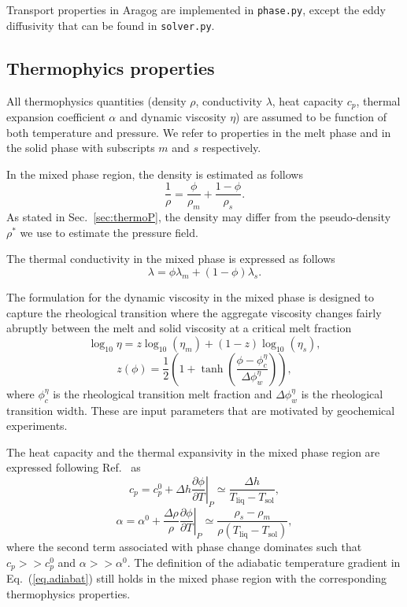 \documentclass{article}
\begin{document}
Transport properties in Aragog are implemented in \texttt{phase.py}, except the eddy diffusivity that can be found in \texttt{solver.py}.

\subsection{Thermophyics properties}

All thermophysics quantities (density $\rho$, conductivity $\lambda$, heat capacity $c_p$, thermal expansion coefficient $\alpha$ and dynamic viscosity $\eta$) are assumed to be function of both temperature and pressure. We refer to properties in the melt phase and in the solid phase with subscripts $m$ and $s$ respectively.

In the mixed phase region, the density is estimated as follows
\begin{equation}
    \frac{1}{\rho}=\frac{\phi}{\rho_m}+\frac{1-\phi}{\rho_s}.
\end{equation}
As stated in Sec.~\ref{sec:thermoP}, the density may differ from the pseudo-density $\rho^*$ we use to estimate the pressure field.

The thermal conductivity in the mixed phase is expressed as follows
\begin{equation}
    \lambda = \phi \lambda_m + (1-\phi)\lambda_s.
\end{equation}

The formulation for the dynamic viscosity in the mixed phase is designed to capture the rheological transition where the aggregate viscosity changes fairly abruptly between the melt and solid viscosity at a critical melt fraction~\cite{BSW18}
\begin{equation}
    \log_{10} \eta = z\log_{10}(\eta_m) + (1-z)\log_{10}(\eta_s),
\end{equation}
\begin{equation}
    z(\phi)=\frac{1}{2}\left(1+\tanh\left( \frac{\phi-\phi_c^\eta}{\Delta\phi_w^\eta}\right) \right),
\end{equation}
where $\phi_c^\eta$ is the rheological transition melt fraction and $\Delta \phi_w^\eta$ is the rheological transition width. These are input parameters that are motivated by geochemical experiments.

The heat capacity and the thermal expansivity in the mixed phase region are expressed following Ref.~\cite{SOLO07} as
\begin{equation}
    c_p = c_p^0 + \Delta h \left.\frac{\partial \phi}{\partial T}\right|_P \simeq \frac{\Delta h}{T_\mathrm{liq}- T_\mathrm{sol}},
\end{equation}
\begin{equation}
    \alpha = \alpha^0 + \frac{\Delta \rho }{\rho} \left.\frac{\partial \phi}{\partial T}\right|_P \simeq \frac{\rho_s-\rho_m}{\rho (T_\mathrm{liq}- T_\mathrm{sol}) },
\end{equation}
where the second term associated with phase change dominates such that $c_p>>c_p^0$ and $ \alpha>> \alpha^0$. The definition of the adiabatic temperature gradient in Eq.~(\ref{eq.adiabat}) still holds in the mixed phase region with the corresponding thermophysics properties.
\end{document}
